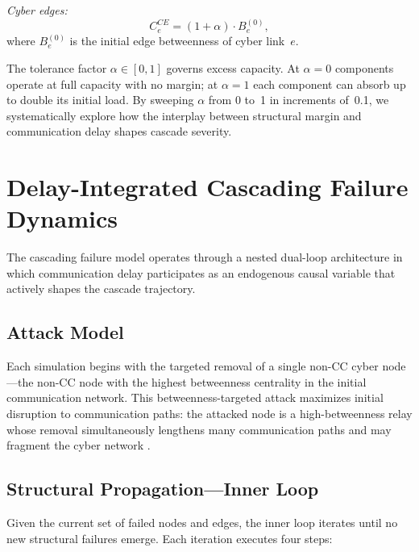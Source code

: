 \documentclass[a4paper,fleqn]{cas-dc}
\begin{document}
\textit{Cyber edges:}
\begin{equation}\label{eq:cap_Ce}
  C_e^{CE} = (1+\alpha)\cdot B_e^{(0)},
\end{equation}
where $B_e^{(0)}$ is the initial edge betweenness of cyber link~$e$.

The tolerance factor $\alpha\in[0,1]$ governs excess capacity.  At
$\alpha=0$ components operate at full capacity with no margin; at
$\alpha=1$ each component can absorb up to double its initial load.  By
sweeping $\alpha$ from 0 to~1 in increments of~0.1, we systematically
explore how the interplay between structural margin and communication
delay shapes cascade severity.


\section{Delay-Integrated Cascading Failure Dynamics}\label{sec:cascade}

The cascading failure model operates through a nested dual-loop
architecture in which communication delay participates as an endogenous
causal variable that actively shapes the cascade trajectory.

\subsection{Attack Model}\label{sec:attack}

Each simulation begins with the targeted removal of a single non-CC
cyber node---the non-CC node with the highest betweenness centrality in
the initial communication network.  This betweenness-targeted attack
maximizes initial disruption to communication paths: the attacked node
is a high-betweenness relay whose removal simultaneously lengthens many
communication paths and may fragment the cyber network
\citep{Albert2000}.

\subsection{Structural Propagation---Inner Loop}\label{sec:inner}

Given the current set of failed nodes and edges, the inner loop iterates
until no new structural failures emerge.  Each iteration executes four
steps:
\end{document}
